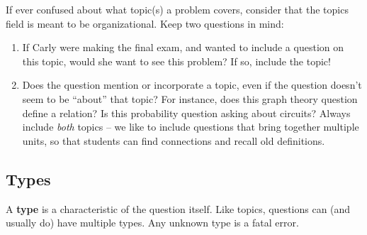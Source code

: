     If ever confused about what topic(s) a problem covers, consider that the topics field is meant to be organizational. Keep two questions in mind:
    
    \begin{enumerate}[1.]\itemsep0pt
      \item If Carly were making the final exam, and wanted to include a question on this topic, would she want to see this problem? If so, include the topic!
      \item Does the question mention or incorporate a topic, even if the question doesn't seem to be ``about'' that topic? For instance, does this graph theory question define a relation? Is this probability question asking about circuits? Always include \textit{both} topics -- we like to include questions that bring together multiple units, so that students can find connections and recall old definitions.
    \end{enumerate}
  
  \subsection{Types}
    A \textbf{type} is a characteristic of the question itself. Like topics, questions can (and usually do) have multiple types. Any unknown type is a fatal error.
    
